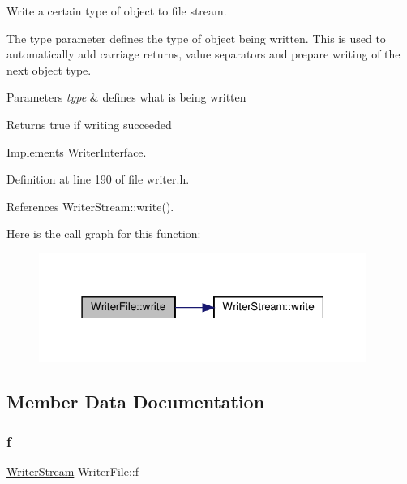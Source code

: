 Write a certain type of object to file stream. 

The type parameter defines the type of object being written. This is used to automatically add carriage returns, value separators and prepare writing of the next object type.


\begin{DoxyParams}{Parameters}
{\em type} & defines what is being written \\
\hline
\end{DoxyParams}
\begin{DoxyReturn}{Returns}
true if writing succeeded 
\end{DoxyReturn}


Implements \hyperlink{classWriterInterface_a2f756ac0b3299f4dbadececad4055424}{Writer\+Interface}.



Definition at line 190 of file writer.\+h.



References Writer\+Stream\+::write().

Here is the call graph for this function\+:
\nopagebreak
\begin{figure}[H]
\begin{center}
\leavevmode
\includegraphics[width=303pt]{classWriterFile_ac540d18943353e011428124a5afcc393_cgraph}
\end{center}
\end{figure}


\subsection{Member Data Documentation}
\mbox{\label{classWriterFile_a5fd0d35dace39b8716c78514893360bc}} 
\subsubsection{\texorpdfstring{f}{f}}
{\footnotesize\ttfamily \hyperlink{classWriterStream}{Writer\+Stream} Writer\+File\+::f\hspace{0.3cm}{\ttfamily [private]}}



